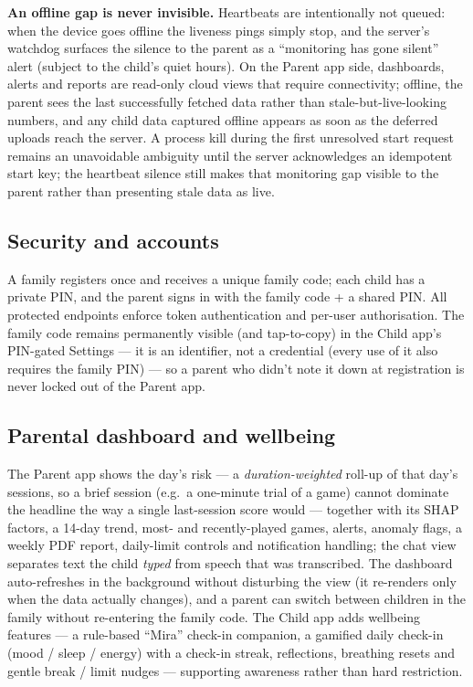 \documentclass[11pt,a4paper]{article}
\begin{document}
\textbf{An offline gap is never invisible.} Heartbeats are intentionally not queued:
when the device goes offline the liveness pings simply stop, and the server's watchdog
surfaces the silence to the parent as a ``monitoring has gone silent'' alert (subject to
the child's quiet hours). On the Parent app side, dashboards, alerts and reports are
read-only cloud views that require connectivity; offline, the parent sees the last
successfully fetched data rather than stale-but-live-looking numbers, and any child data
captured offline appears as soon as the deferred uploads reach the server. A process
kill during the first unresolved start request remains an unavoidable ambiguity until
the server acknowledges an idempotent start key; the heartbeat silence still makes that
monitoring gap visible to the parent rather than presenting stale data as live.

\subsection{Security and accounts}
A family registers once and receives a unique family code; each child has a private
PIN, and the parent signs in with the family code + a shared PIN. All protected
endpoints enforce token authentication and per-user authorisation. The family code
remains permanently visible (and tap-to-copy) in the Child app's PIN-gated Settings
--- it is an identifier, not a credential (every use of it also requires the family
PIN) --- so a parent who didn't note it down at registration is never locked out of
the Parent app.

\subsection{Parental dashboard and wellbeing}
The Parent app shows the day's risk --- a \emph{duration-weighted} roll-up of that
day's sessions, so a brief session (e.g.\ a one-minute trial of a game) cannot dominate
the headline the way a single last-session score would --- together with its SHAP
factors, a 14-day trend, most- and recently-played games, alerts, anomaly flags, a
weekly PDF report, daily-limit controls and notification handling; the chat view
separates text the child \emph{typed} from speech that was transcribed. The dashboard
auto-refreshes in the background without disturbing the view (it re-renders only when the
data actually changes), and a parent can switch between children in the family without
re-entering the family code. The Child app adds wellbeing features --- a rule-based
``Mira'' check-in companion, a gamified daily check-in (mood / sleep / energy) with a
check-in streak, reflections, breathing resets and gentle break / limit nudges ---
supporting awareness rather than hard restriction.
\end{document}
